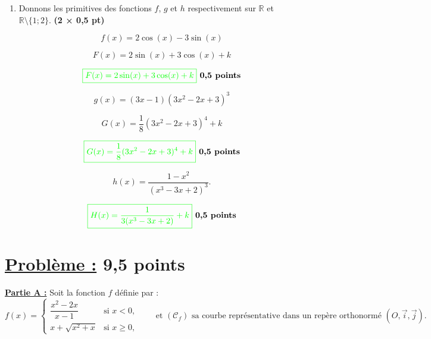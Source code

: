 \documentclass[12pt,a4paper]{article}
\begin{document}
\begin{enumerate}
    \begin{align*}
    \lim_{x \to 1} \dfrac{\sin(\pi x)}{x - 1}&=\lim_{X \to 0}\dfrac{\sin(\pi X)}{X}\\
    																				&=\lim_{X \to 0}\pi\dfrac{\sin(\pi X)}{\pi X}\\
    																				&=1
    \end{align*}
\[
\textcolor{green}{\boxed{ \lim_{x \to 1} \dfrac{\sin(\pi x)}{x - 1}=1 }} \textbf{ 1 points}
\]

    \item Donnons les primitives des fonctions \(f\), \(g\) et \(h\) respectivement sur \(\mathbb{R}\) et \(\mathbb{R} \setminus \{1; 2\}\). \textbf{(2 × 0,5 pt)}

		\[ 
		f(x)=2\cos(x)-3\sin(x)
		\]    

		\[ F(x)=2\sin(x)+3\cos(x) + k \]    

    \[
     \textcolor{green}{\boxed{ F(x)=2\sin(x)+3\cos(x) + k }} \textbf{ 0,5 points}
    \]    
    
    \[
    g(x) = (3x-1)(3x^2-2x+3)^3 
    \]

		\[
    G(x) =\dfrac{1}{8}(3x^2-2x+3)^4+k
    \] 
       
    \[
     \textcolor{green}{\boxed{ G(x) =\dfrac{1}{8}(3x^2-2x+3)^4 + k }} \textbf{ 0,5 points}
    \]
    
    \[
    h(x) = \dfrac{1-x^2}{(x^3-3x+2)^3}.
    \]
    
    \[
     \textcolor{green}{\boxed{ H(x) = \dfrac{1}{3(x^3-3x+2)} + k }} \textbf{ 0,5 points}
    \]
\end{enumerate}

\section*{\underline{Problème :} 9,5 points}

\underline{\textbf{Partie A :}}
Soit la fonction $f$ définie par :
\[
f(x)=
\begin{cases}
\dfrac{x^2-2x}{x-1} & \text{si } x<0,\\[4mm]
x + \sqrt{x^2+x} & \text{si } x\ge 0,
\end{cases}
\qquad
\text{et } (\mathcal{C}_f) \text{ sa courbe représentative dans un repère orthonormé } (O,\vec{i},\vec{j}).
\]
\end{document}
